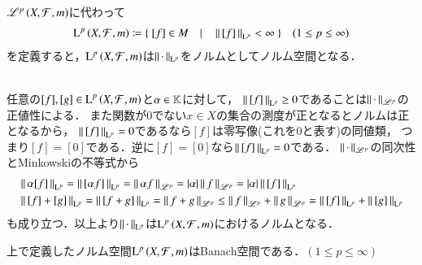 $\mathscr{L}^{p} \left(X,\mathcal{F},m\right)$に代わって
\begin{align}
	\operatorname{L}^{p} \left(X,\mathcal{F},m\right) \coloneqq \{\ [f] \in M \quad |\quad \left\|\, [f]\, \right\|_{\mathrm{L}^p} < \infty\ \} \quad (1 \leq p \leq \infty)
\end{align}
を定義すると，$\operatorname{L}^{p} \left(X,\mathcal{F},m\right)$は$\left\|\, \cdot\, \right\|_{\mathrm{L}^p}$をノルムとしてノルム空間となる．
\begin{bcs}\mbox{}\\
	任意の$[f],[g] \in \operatorname{L}^{p} \left(X,\mathcal{F},m\right)$と$\alpha \in \mathbb{K}$に対して，
	$\left\|\, [f]\, \right\|_{\mathrm{L}^p} \geq 0$であることは$\left\|\, \cdot\, \right\|_{\mathscr{L}^p}$の正値性による．
	また関数が0でない$x \in X$の集合の測度が正となるとノルムは正となるから，
	$\left\|\, [f]\, \right\|_{\mathrm{L}^p} = 0$であるなら$[f]$は零写像(これを0と表す)の同値類，
	つまり$[f] = [0]$である．逆に$[f] = [0]$なら$\left\|\, [f]\, \right\|_{\mathrm{L}^p} = 0$である．
	$\left\|\, \cdot\, \right\|_{\mathscr{L}^p}$の同次性とMinkowskiの不等式から
	\begin{align}
		&\left\|\, \alpha[f]\, \right\|_{\mathrm{L}^p} = \left\|\, [\alpha f]\, \right\|_{\mathrm{L}^p} = \left\|\, \alpha f\, \right\|_{\mathscr{L}^p} = |\alpha|\left\|\, f\, \right\|_{\mathscr{L}^p} = |\alpha|\left\|\, [f]\, \right\|_{\mathrm{L}^p} \\
		&\left\|\, [f] + [g]\, \right\|_{\mathrm{L}^p} = \left\|\, [f + g]\, \right\|_{\mathrm{L}^p} = \left\|\, f + g\, \right\|_{\mathscr{L}^p} \leq \left\|\, f\, \right\|_{\mathscr{L}^p} + \left\|\, g\, \right\|_{\mathscr{L}^p} = \left\|\, [f]\, \right\|_{\mathrm{L}^p} + \left\|\, [g]\, \right\|_{\mathrm{L}^p}
	\end{align}
	も成り立つ．以上より$\left\|\, \cdot\, \right\|_{\mathrm{L}^p}$は$\operatorname{L}^{p} \left(X,\mathcal{F},m\right)$におけるノルムとなる．
	\QED
\end{bcs}

\begin{prp}
	上で定義したノルム空間$\operatorname{L}^{p} \left(X,\mathcal{F},m\right)$はBanach空間である．$(1 \leq p \leq \infty)$
\end{prp}
\begin{prf}
\end{prf}
\begin{qst}
\end{qst}